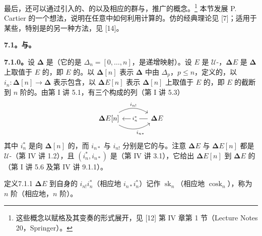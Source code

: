 最后，还可以通过引入的、的以及相应的群与，推广的概念。\footnote{这些概念以赋格及其变奏的形式展开，见 [12] 第 IV 章第 1 节（Lecture Notes 20，Springer）。}
本节发展 P. Cartier 的一个想法，说明在任意中如何利用计算的。仿的经典理论见 [7]；适用于某些，特别是的另一种方法，见 [14]。

\textbf{7.1。与。}

\textbf{7.1.0。}设 $\boldsymbol\Delta$ 是（它的是 $\Delta_n=[0,\ldots,n]$，是递增映射）。设 $E$ 是 $\mathcal U$-，$\boldsymbol\Delta E$ 是 $\boldsymbol\Delta$ 上取值于 $E$ 的，即 $E$ 的。以 $\boldsymbol\Delta[n]$ 表示 $\boldsymbol\Delta$ 中由 $\Delta_p$，$p\leq n$，定义的，以 $i_n:\boldsymbol\Delta[n]\to\boldsymbol\Delta$ 表示包含，以 $\boldsymbol\Delta E[n]$ 表示 $\boldsymbol\Delta[n]$ 上取值于 $E$ 的，即 $E$ 的截断到 $n$ 阶的。由第 I 讲 5.1，有三个构成的列（第 I 讲 5.3）
\[\begin{tikzcd}[column sep=large]
\boldsymbol\Delta E[n]\arrow[r,bend left=32,"i_{n!}"]\arrow[r,bend right=32,"i_{n*}"']&\boldsymbol\Delta E\arrow[l,"i_n^*" description]
\end{tikzcd}\]
其中 $i_n^*$ 是向 $\boldsymbol\Delta[n]$ 的，而 $i_{n*}$ 与 $i_{n!}$ 分别是它的与。注意 $\boldsymbol\Delta E$ 与 $\boldsymbol\Delta E[n]$ 都是 $\mathcal U$-（第 IV 讲 1.2），且 $(i_n^*,i_{n*})$ 是（第 IV 讲 3.1），它给出 $\boldsymbol\Delta E[n]$ 到 $\boldsymbol\Delta E$ 的（第 I 讲 5.6 及第 IV 讲 9.1.1）。
\begin{SGAresult}{定义}{7.1.1}
$\boldsymbol\Delta E$ 到自身的 $i_{n!}i_n^*$（相应地 $i_{n*}i_n^*$）记作 $\operatorname{sk}_n$（相应地 $\operatorname{cosk}_n$），称为 $n$ 阶（相应地，$n$ 阶）。
\end{SGAresult}
